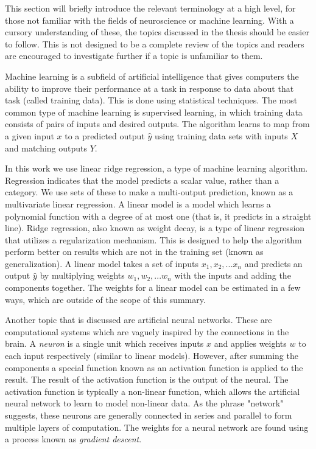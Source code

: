 This section will briefly introduce the relevant terminology at a high level, 
for those not familiar with the fields of neuroscience or machine learning.  
With a cursory understanding of these, the topics discussed in the thesis 
should be easier to follow. This is not designed to be a complete review of the 
topics and readers are encouraged to investigate further if a topic is 
unfamiliar to them.

Machine learning is a subfield of artificial intelligence that gives computers 
the ability to improve their performance at a task in response to data about 
that task (called training data). This is done using statistical techniques.  
The most common type of machine learning is supervised learning, in which 
training data consists of pairs of inputs and desired outputs. The algorithm 
learns to map from a given input $x$ to a predicted output $\hat{y}$ using 
training data sets with inputs $X$ and matching outputs $Y$.

In this work we use linear ridge regression, a type of machine learning 
algorithm. Regression indicates that the model predicts a scalar value, rather 
than a category. We use sets of these to make a multi-output prediction, known 
as a multivariate linear regression. A linear model is a model which learns a 
polynomial function with a degree of at most one (that is, it predicts in a 
straight line). Ridge regression, also known as weight decay, is a type of 
linear regression that utilizes a regularization mechanism. This is designed to 
help the algorithm perform better on results which are not in the training set 
(known as generalization). A linear model takes a set of inputs $x_1, x_2, ...  
x_n$ and predicts an output $\hat{y}$ by multiplying weights $w_1, w_2, ...  
w_n$ with the inputs and adding the components together. The weights for a 
linear model can be estimated in a few ways, which are outside of the scope of 
this summary.

Another topic that is discussed are artificial neural networks. These are 
computational systems which are vaguely inspired by the connections in the 
brain. A \emph{neuron} is a single unit which receives inputs $x$ and applies 
weights $w$ to each input respectively (similar to linear models). However, 
after summing the components a special function known as an activation function 
is applied to the result. The result of the activation function is the output 
of the neural. The activation function is typically a non-linear function, 
which allows the artificial neural network to learn to model non-linear data.  
As the phrase "network" suggests, these neurons are generally connected in 
series and parallel to form multiple layers of computation. The weights for a 
neural network are found using a process known as \emph{gradient descent}. 

